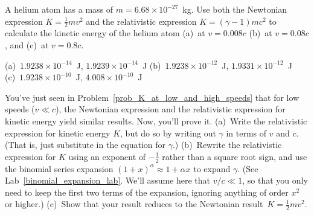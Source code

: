 \begin{Exercise}[difficulty=0]
\label{prob_K_at_low_and_high_speeds}
A helium atom has a mass of $m=6.68 \times 10^{-27}$~kg.  Use both the Newtonian expression $K=\frac{1}{2} mv^2$ and the relativistic expression $K=(\gamma -1)mc^2$ to calculate the kinetic energy of the helium atom (a)~at $v=0.008c$ (b)~at $v=0.08c$, and (c)~at $v=0.8c$.
\end{Exercise}
\begin{Answer}
(a)~$1.9238 \times 10^{-14}$~J, $1.9239 \times 10^{-14}$~J  
(b)~$1.9238 \times 10^{-12}$~J, $1.9331 \times 10^{-12}$~J  
(c)~$1.9238 \times 10^{-10}$~J, $4.008 \times 10^{-10}$~J
\end{Answer}


\begin{Exercise}[difficulty=0]
You've just seen in Problem~\ref{prob_K_at_low_and_high_speeds} that for low speeds ($v \ll c$), the Newtonian expression and the relativistic expression for kinetic energy yield similar results.  Now, you'll prove it.  (a)~Write the relativistic expression for kinetic energy $K$, but do so by writing out $\gamma$ in terms of $v$ and $c$.  (That is, just substitute in the equation for $\gamma$.)  (b)~Rewrite the relativistic expression for $K$ using an exponent of $-\frac{1}{2}$ rather than a square root sign, and use the binomial series expansion $(1+x)^\alpha \approx 1+\alpha x$ to expand $\gamma$.  (See Lab~\ref{binomial_expansion_lab}.  We'll assume here that $v/c \ll 1$, so that you only need to keep the first two terms of the expansion, ignoring anything of order $x^2$ or higher.)  (c)~Show that your result reduces to the Newtonian result~$K=\frac{1}{2} mv^2$.
\end{Exercise}


